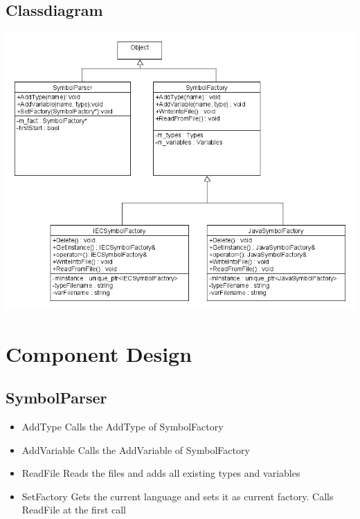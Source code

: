 \subsection{Classdiagram}
\includegraphics[scale=0.65]{ClassDiagramm}


\newpage
\section{Component Design}
\subsection{SymbolParser}
\begin{itemize}
	\item AddType
	\subitem Calls the AddType of SymbolFactory
	\item AddVariable
	\subitem Calls the AddVariable of SymbolFactory
	\item ReadFile
	\subitem Reads the files and adds all existing types and variables
	\item SetFactory
	 \subitem Gets the current language and sets it as current factory. Calls ReadFile at the first call
\end{itemize}



